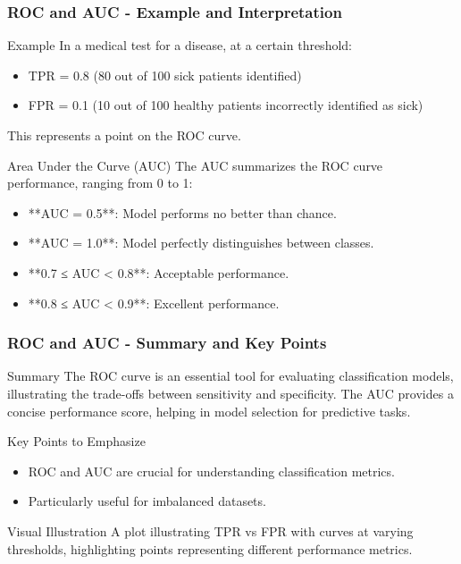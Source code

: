 \documentclass[aspectratio=169]{beamer}
\begin{document}
\begin{frame}[fragile]
    \frametitle{ROC and AUC - Example and Interpretation}
    \begin{block}{Example}
        In a medical test for a disease, at a certain threshold:
        \begin{itemize}
            \item TPR = 0.8 (80 out of 100 sick patients identified)
            \item FPR = 0.1 (10 out of 100 healthy patients incorrectly identified as sick)
        \end{itemize}
        This represents a point on the ROC curve.
    \end{block}

    \begin{block}{Area Under the Curve (AUC)}
        The AUC summarizes the ROC curve performance, ranging from 0 to 1:
        \begin{itemize}
            \item **AUC = 0.5**: Model performs no better than chance.
            \item **AUC = 1.0**: Model perfectly distinguishes between classes.
            \item **0.7 ≤ AUC < 0.8**: Acceptable performance.
            \item **0.8 ≤ AUC < 0.9**: Excellent performance.
        \end{itemize}
    \end{block}
\end{frame}

\begin{frame}[fragile]
    \frametitle{ROC and AUC - Summary and Key Points}
    \begin{block}{Summary}
        The ROC curve is an essential tool for evaluating classification models, illustrating the trade-offs between sensitivity and specificity. The AUC provides a concise performance score, helping in model selection for predictive tasks.
    \end{block}

    \begin{block}{Key Points to Emphasize}
        \begin{itemize}
            \item ROC and AUC are crucial for understanding classification metrics.
            \item Particularly useful for imbalanced datasets.
        \end{itemize}
    \end{block}

    \begin{block}{Visual Illustration}
        A plot illustrating TPR vs FPR with curves at varying thresholds, highlighting points representing different performance metrics.
    \end{block}
\end{frame}
\end{document}
